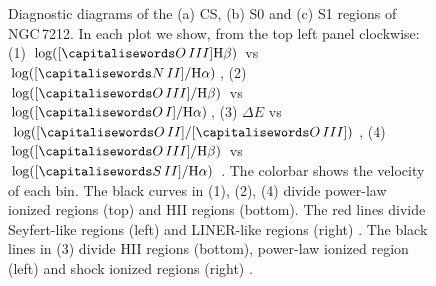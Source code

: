 \documentclass[../main.tex]{subfiles}
\begin{document}
\begin{figure}
\centering
{} \quad
{}\\
\\
\caption[]{Diagnostic diagrams of the (a) CS, (b) S0 and (c) S1 regions of NGC\,7212. In each plot we show, from the top left panel clockwise: (1) $\log([\ion{O}{III}] \Hb)$ vs $\log([\ion{N}{II}]/ \Ha)$, (2) $\log([\ion{O}{III}]/ \Hb)$ vs $\log([\ion{O}{I}]/ \Ha)$, (3) $\Delta E$ vs $\log([\ion{O}{II}]/[\ion{O}{III}])$, (4) $\log([\ion{O}{III}]/ \Hb)$ vs $\log([\ion{S}{II}]/ \Ha)$ \citep{Baldwin81, Veilleux87}. The colorbar shows the velocity of each bin. The black curves in (1), (2), (4) divide power-law ionized regions (top) and HII regions (bottom). The red lines divide Seyfert-like regions (left) and LINER-like regions (right) \citep{Kewley06}. The black lines in (3) divide HII regions (bottom), power-law ionized region (left) and shock ionized regions (right) \citep{Baldwin81}. }
\label{fig:diag_s1N}
\end{figure}
\end{document}
